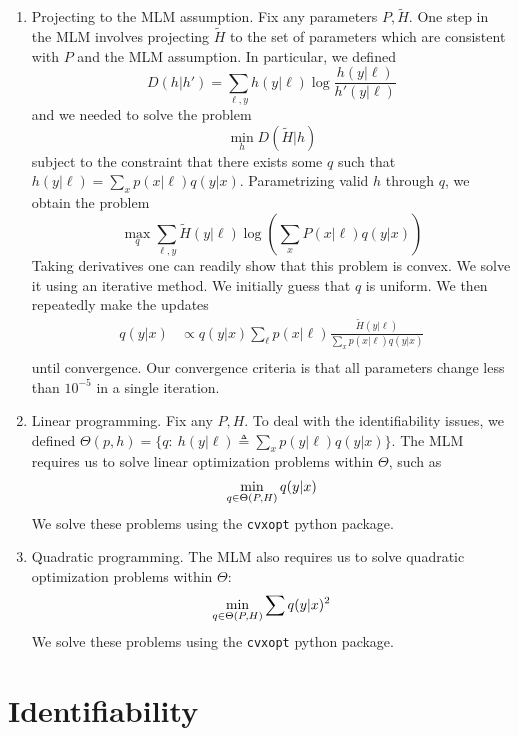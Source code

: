 \begin{enumerate}

    \item Projecting to the MLM assumption.  Fix any parameters $P,\tilde H$.  One step in the MLM involves projecting $\tilde H$ to the set of parameters which are consistent with $P$ and the MLM assumption.  In particular, we defined
    \[
    D(h|h') = \sum_{\ell,y} h(y|\ell) \log \frac{h(y|\ell)}{h'(y|\ell)}
    \]
    and we needed to solve the problem
    \[
    \min_{h} D(\tilde H|h)
    \]
    subject to the constraint that there exists some $q$ such that $h(y|\ell)=\sum_x p(x|\ell)q(y|x)$.  Parametrizing valid $h$ through $q$, we obtain the problem
    \[
    \max_{q} \sum_{\ell,y} \tilde H(y|\ell) \log \left(\sum_x P(x|\ell) q(y|x)\right)
    \]
    Taking derivatives one can readily show that this problem is convex.  We solve it using an iterative method.  We initially guess that $q$ is uniform.  We then repeatedly make the updates
    \begin{align*}
    q(y|x)  &\propto q(y|x)\sum_{\ell}p(x|\ell)\frac{\tilde H(y|\ell)}{\sum_x p(x|\ell)q(y|x)}\\
    \end{align*}
    until convergence.  Our convergence criteria is that all parameters change less than $10^{-5}$ in a single iteration.

    \item Linear programming.  Fix any $P,H$.  To deal with the identifiability issues, we defined $\Theta(p,h)=\{q:\ h(y|\ell) \triangleq \sum_x p(y|\ell)q(y|x)\}$.  The MLM requires us to solve linear optimization problems within $\Theta$, such as 
    \[
    \min_{q\in \Theta(P,H)} q(y|x) \\
    \]
    We solve these problems using the {\tt cvxopt} python package.

    \item Quadratic programming.  The MLM also requires us to solve quadratic optimization problems within $\Theta$:
    \[
    \min_{q\in \Theta(P,H)} \sum q(y|x)^2 \\
    \]
    We solve these problems using the {\tt cvxopt} python package.


\end{enumerate}

\section{Identifiability}

\label{sec:casestudies}

